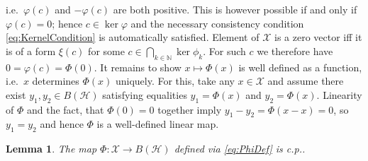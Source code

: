\documentclass[reqno]{amsart}
\theoremstyle{plain}
\newtheorem{lemma}{Lemma}
\numberwithin{equation}{section}
\numberwithin{theorem}{section}
\numberwithin{lemma}{section}
\numberwithin{definition}{section}
\numberwithin{corollary}{section}
\numberwithin{remark}{section}
\newcommand{\naturals}{\mathbb{N}}
\newcommand{\hilbert}{\mathcal{H}}
\begin{document}
i.e.~$\varphi(c)$ and $-\varphi(c)$ are both positive. This is however possible if and only if $\varphi(c) = 0$; hence $c\in\ker{\varphi}$ and the necessary consistency condition \eqref{eq:KernelCondition} is automatically satisfied. Element of $\mathscr{X}$ is a zero vector iff it is of a form $\xi(c)$ for some $c\in\bigcap_{k\in\naturals}\ker{\phi_k}$. For such $c$ we therefore have $0 = \varphi(c) = \Phi(0)$. It remains to show $x\mapsto\Phi(x)$ is well defined as a function, i.e.~$x$ determines $\Phi(x)$ uniquely. For this, take any $x\in\mathscr{X}$ and assume there exist $y_1, y_2 \in B(\hilbert)$ satisfying equalities $y_1 = \Phi(x)$ and $y_2 = \Phi(x)$. Linearity of $\Phi$ and the fact, that $\Phi(0) = 0$ together imply $y_1 - y_2 = \Phi (x-x) = 0$, so $y_1 = y_2$ and hence $\Phi$ is a well-defined linear map.

\begin{lemma}\label{lemma:PhiCP}
    The map $\Phi : \mathscr{X} \to B(\hilbert)$ defined via \eqref{eq:PhiDef} is c.p..
\end{lemma}
\end{document}
